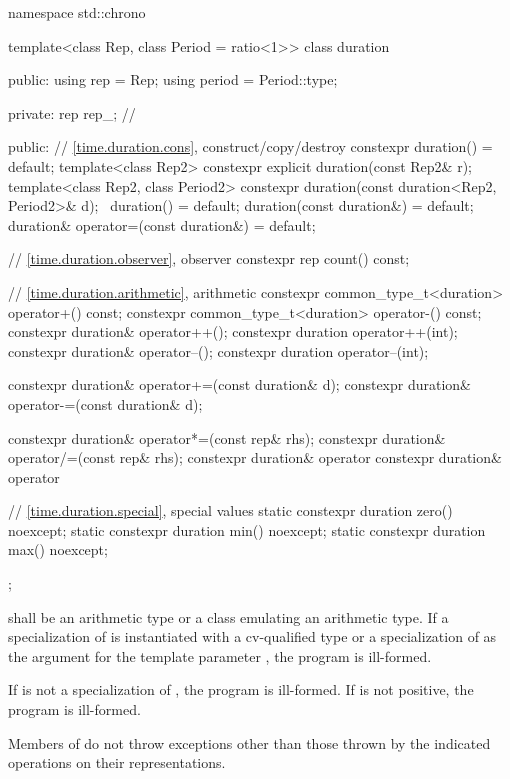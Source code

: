 %
\begin{codeblock}
namespace std::chrono {
  template<class Rep, class Period = ratio<1>>
  class duration {
  public:
    using rep    = Rep;
    using period = Period::type;

  private:
    rep rep_;       // \expos

  public:
    // \ref{time.duration.cons}, construct/copy/destroy
    constexpr duration() = default;
    template<class Rep2>
      constexpr explicit duration(const Rep2& r);
    template<class Rep2, class Period2>
      constexpr duration(const duration<Rep2, Period2>& d);
    ~duration() = default;
    duration(const duration&) = default;
    duration& operator=(const duration&) = default;

    // \ref{time.duration.observer}, observer
    constexpr rep count() const;

    // \ref{time.duration.arithmetic}, arithmetic
    constexpr common_type_t<duration> operator+() const;
    constexpr common_type_t<duration> operator-() const;
    constexpr duration& operator++();
    constexpr duration  operator++(int);
    constexpr duration& operator--();
    constexpr duration  operator--(int);

    constexpr duration& operator+=(const duration& d);
    constexpr duration& operator-=(const duration& d);

    constexpr duration& operator*=(const rep& rhs);
    constexpr duration& operator/=(const rep& rhs);
    constexpr duration& operator%
    constexpr duration& operator%

    // \ref{time.duration.special}, special values
    static constexpr duration zero() noexcept;
    static constexpr duration min() noexcept;
    static constexpr duration max() noexcept;
  };
}
\end{codeblock}

\pnum
{} shall be an arithmetic type or a class emulating an arithmetic type.
If a specialization of 
is instantiated with
a cv-qualified type or a specialization of 
as the argument for the template
parameter , the program is ill-formed.

\pnum
If  is not a specialization of , the program is ill-formed.
If  is not positive, the program is ill-formed.

\pnum
Members of  do not throw exceptions other than
those thrown by the indicated operations on their representations.

